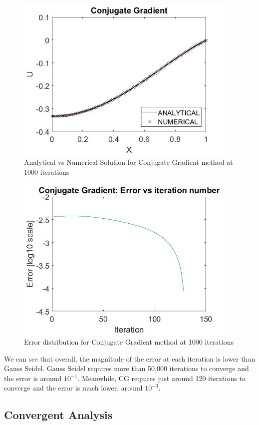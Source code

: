 \documentclass{article}
\begin{document}
\begin{figure}[H]
	\includegraphics[width=\linewidth,height=80mm]{CG.jpg}
	\caption{Analytical vs Numerical Solution for Conjugate Gradient method at 1000 iterations}
\end{figure}

\begin{figure}[H]
	\includegraphics[width=\linewidth,height=80mm]{CG_error.jpg}
	\caption{Error distribution for Conjugate Gradient method at 1000 iterations}
\end{figure}

\noindent
We can see that overall, the magnitude of the error at each iteration is lower than Gauss Seidel. Gauss Seidel requires more than 50,000 iterations to converge and the error is around $10^{-1}$. Meanwhile, CG requires just around 120 iterations to converge and the error is much lower, around $10^{-3}$.   


\subsection{Convergent Analysis}
\end{document}
